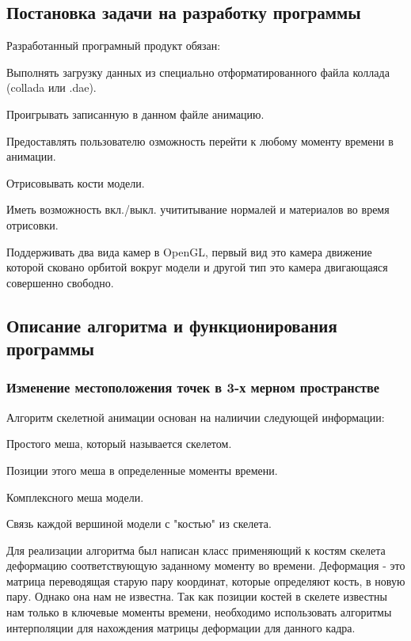 \subsection{Постановка задачи на разработку программы}
Разработанный програмный продукт обязан:
\begin{my_enumerate}
\item Выполнять загрузку данных из специально отформатированного файла коллада (collada или .dae).
\item Проигрывать записанную в данном файле анимацию.
\item Предоставлять пользователю озможность перейти к любому моменту времени в анимации.
\item Отрисовывать кости модели.
\item Иметь возможность вкл./выкл. учититывание нормалей и материалов во время отрисовки.
\item Поддерживать два вида камер в OpenGL, первый вид это камера движение которой сковано орбитой вокруг модели и другой тип это камера двигающаяся совершенно свободно.
\end{my_enumerate}


\subsection{Описание алгоритма и функционирования программы}

\subsubsection{Изменение местоположения точек в 3-х мерном пространстве}
Алгоритм скелетной анимации основан на налиичии следующей информации:
\begin{my_enumerate}
\item Простого меша, который называется скелетом.
\item Позиции этого меша в определенные моменты времени.
\item Комплексного меша модели.
\item Связь каждой вершиной модели с "костью" из скелета.
\end{my_enumerate}

Для реализации алгоритма был написан класс применяющий к костям скелета деформацию соответствующую заданному моменту во времени. Деформация - это матрица переводящая старую пару координат, которые определяют кость, в новую пару. Однако она нам не известна. Так как позиции костей в скелете известны нам только в ключевые моменты времени, необходимо использовать алгоритмы интерполяции для нахождения матрицы деформации для данного кадра. 

